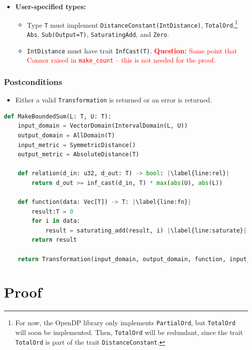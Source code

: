\documentclass[11pt,a4paper]{article}
\theoremstyle{definition}
\newcommand{\questionc}[1]{\textcolor{red}{\textbf{Question:} #1}}
\begin{document}
\begin{itemize}
    \item \textbf{User-specified types:}
    \begin{itemize}
        \item Type \texttt{T} must implement \texttt{DistanceConstant(IntDistance)}, \texttt{TotalOrd},\footnote{For now, the OpenDP library only implements \texttt{PartialOrd}, but \texttt{TotalOrd} will soon be implemented. Then, \texttt{TotalOrd} will be redundant, since the trait \texttt{TotalOrd} is part of the trait \texttt{DistanceConstant}.} \texttt{Abs}, \texttt{Sub(Output=T)}, \texttt{SaturatingAdd}, and \texttt{Zero}.
        \item \texttt{IntDistance} must have trait \texttt{InfCast(T)}. \questionc{Same point that Connor raised in \texttt{make\_count} -- this is not needed for the proof.}
\end{itemize}
\end{itemize}

\subsubsection*{Postconditions}
\begin{itemize}
    \item Either a valid \texttt{Transformation} is returned or an error is returned.
\end{itemize}

\begin{lstlisting}[language=Python, escapechar=|]
def MakeBoundedSum(L: T, U: T):
    input_domain = VectorDomain(IntervalDomain(L, U))
    output_domain = AllDomain(T)
    input_metric = SymmetricDistance()
    output_metric = AbsoluteDistance(T)
    
    def relation(d_in: u32, d_out: T) -> bool: |\label{line:rel}|
        return d_out >= inf_cast(d_in, T) * max(abs(U), abs(L))
    
    def function(data: Vec[T]) -> T: |\label{line:fn}|
        result:T = 0
        for i in data:
            result = saturating_add(result, i) |\label{line:saturate}|
        return result
        
    return Transformation(input_domain, output_domain, function, input_metric, output_metric, stability_relation = Relation)
\end{lstlisting}

\section{Proof}
\end{document}
